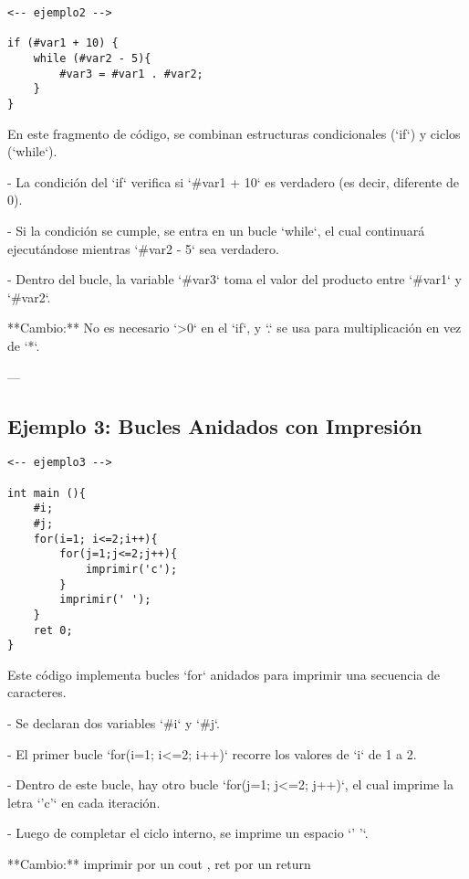 \documentclass{article}
\begin{document}
\begin{verbatim}
<-- ejemplo2 -->

if (#var1 + 10) {
    while (#var2 - 5){
        #var3 = #var1 . #var2;
    }
}
\end{verbatim}

En este fragmento de código, se combinan estructuras condicionales (`if`) y ciclos (`while`).  

- La condición del `if` verifica si `#var1 + 10` es verdadero (es decir, diferente de 0).  

- Si la condición se cumple, se entra en un bucle `while`, el cual continuará ejecutándose mientras `#var2 - 5` sea verdadero.  

- Dentro del bucle, la variable `#var3` toma el valor del producto entre `#var1` y `#var2`.  

**Cambio:** No es necesario `\textgreater 0` en el `if`, y `.` se usa para multiplicación en vez de `*`.  

---

\subsection{Ejemplo 3: Bucles Anidados con Impresión}

\begin{verbatim}
<-- ejemplo3 -->

int main (){
    #i;
    #j;
    for(i=1; i<=2;i++){
        for(j=1;j<=2;j++){
            imprimir('c');
        }
        imprimir(' ');
    }
    ret 0;
}
\end{verbatim}

Este código implementa bucles `for` anidados para imprimir una secuencia de caracteres.  

- Se declaran dos variables `#i` y `#j`.  

- El primer bucle `for(i=1; i<=2; i++)` recorre los valores de `i` de 1 a 2.  

- Dentro de este bucle, hay otro bucle `for(j=1; j<=2; j++)`, el cual imprime la letra `'c'` en cada iteración.  

- Luego de completar el ciclo interno, se imprime un espacio `' '`.  

**Cambio:** imprimir por un cout , ret por un return 
\end{document}
